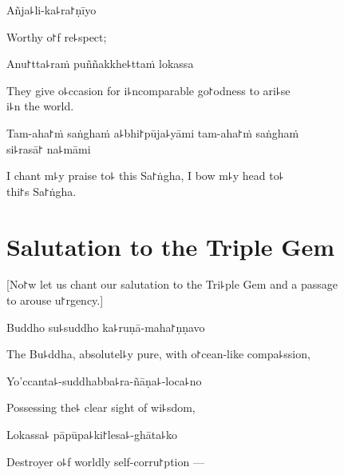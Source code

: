 Añja꜕li-ka꜕ra꜓ṇīyo

\begin{english}
  Worthy o꜓f re꜕spect;
\end{english}

Anu꜓tta꜕raṁ puññakkhe꜕ttaṁ lokassa

\begin{english}
  They give o꜕ccasion for i꜕ncomparable go꜓odness to ari꜕se \\i꜕n the world.
\end{english}

Tam-aha꜓ṁ saṅghaṁ a꜕bhi꜓pūja꜕yāmi tam-aha꜓ṁ saṅghaṁ \\si꜕rasā꜓ na꜕māmi

\begin{english}
  I chant m꜕y praise to꜕ this Sa꜓ṅgha, I bow m꜕y head to꜕\\ thi꜓s Sa꜓ṅgha.
\end{english}

\clearpage

\chapter{Salutation to the Triple Gem}

\begin{leader}
\end{leader}

\begin{english}
  [No꜓w let us chant our salutation to the Tri꜕ple Gem and a passage \\to arouse u꜓rgency.]
\end{english}

Buddho su꜕suddho ka꜕ruṇā-maha꜓ṇṇavo

\begin{english}
  The Bu꜕ddha, absolutel꜕y pure, with o꜓cean-like compa꜕ssion,
\end{english}

Yo'ccanta꜕-suddhabba꜕ra-ñāṇa꜕-loca꜕no

\begin{english}
  Possessing the꜕ clear sight of wi꜕sdom,
\end{english}

Lokassa꜕ pāpūpa꜕ki꜓lesa꜕-ghāta꜕ko

\begin{english}
  Destroyer o꜕f worldly self-corru꜓ption ---
\end{english}

